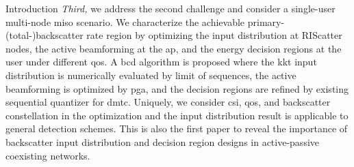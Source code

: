 \documentclass[journal]{IEEEtran}
\begin{document}
\begin{section}{Introduction}
	\emph{Third,} we address the second challenge and consider a single-user multi-node \gls{miso} scenario.
	We characterize the achievable primary-(total-)backscatter rate region by optimizing the input distribution at RIScatter nodes, the active beamforming at the \gls{ap}, and the energy decision regions at the user under different \gls{qos}.
	A \gls{bcd} algorithm is proposed where the \gls{kkt} input distribution is numerically evaluated by limit of sequences, the active beamforming is optimized by \gls{pga}, and the decision regions are refined by existing sequential quantizer for \gls{dmtc}.
	Uniquely, we consider \gls{csi}, \gls{qos}, and backscatter constellation in the optimization and the input distribution result is applicable to general detection schemes.
	This is also the first paper to reveal the importance of backscatter input distribution and decision region designs in active-passive coexisting networks.



\end{section}
\end{document}
